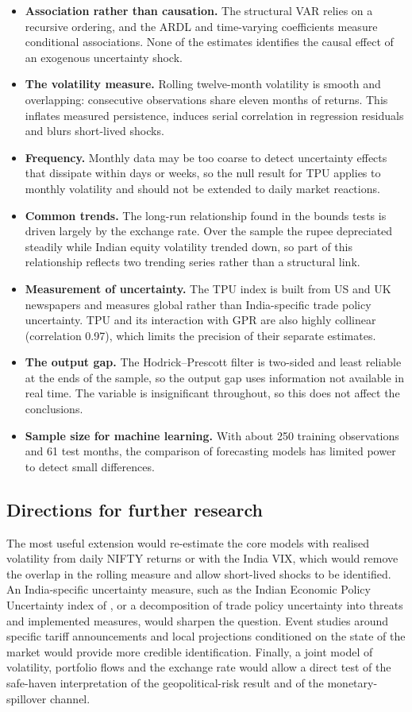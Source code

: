 \documentclass[10pt,twocolumn,a4paper]{article}
\begin{document}
\begin{itemize}
  \item \textbf{Association rather than causation.} The structural VAR relies on a recursive ordering, and the ARDL and time-varying coefficients measure conditional associations. None of the estimates identifies the causal effect of an exogenous uncertainty shock.
  \item \textbf{The volatility measure.} Rolling twelve-month volatility is smooth and overlapping: consecutive observations share eleven months of returns. This inflates measured persistence, induces serial correlation in regression residuals and blurs short-lived shocks.
  \item \textbf{Frequency.} Monthly data may be too coarse to detect uncertainty effects that dissipate within days or weeks, so the null result for TPU applies to monthly volatility and should not be extended to daily market reactions.
  \item \textbf{Common trends.} The long-run relationship found in the bounds tests is driven largely by the exchange rate. Over the sample the rupee depreciated steadily while Indian equity volatility trended down, so part of this relationship reflects two trending series rather than a structural link.
  \item \textbf{Measurement of uncertainty.} The TPU index is built from US and UK newspapers and measures global rather than India-specific trade policy uncertainty. TPU and its interaction with GPR are also highly collinear (correlation 0.97), which limits the precision of their separate estimates.
  \item \textbf{The output gap.} The Hodrick--Prescott filter is two-sided and least reliable at the ends of the sample, so the output gap uses information not available in real time. The variable is insignificant throughout, so this does not affect the conclusions.
  \item \textbf{Sample size for machine learning.} With about 250 training observations and 61 test months, the comparison of forecasting models has limited power to detect small differences.
\end{itemize}

\subsection{Directions for further research}

The most useful extension would re-estimate the core models with realised volatility from daily NIFTY returns or with the India VIX, which would remove the overlap in the rolling measure and allow short-lived shocks to be identified. An India-specific uncertainty measure, such as the Indian Economic Policy Uncertainty index of \citet{baker2016}, or a decomposition of trade policy uncertainty into threats and implemented measures, would sharpen the question. Event studies around specific tariff announcements and local projections conditioned on the state of the market would provide more credible identification. Finally, a joint model of volatility, portfolio flows and the exchange rate would allow a direct test of the safe-haven interpretation of the geopolitical-risk result and of the monetary-spillover channel.
\end{document}
